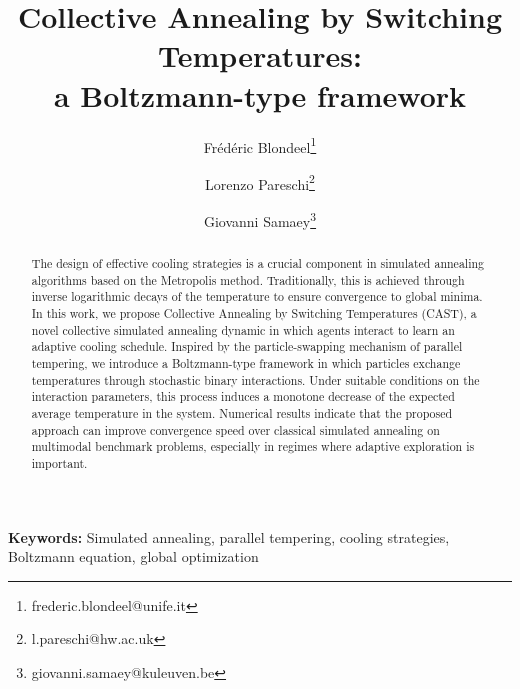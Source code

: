 \documentclass[10pt,a4paper]{article}
\theoremstyle{theorem}
\numberwithin{equation}{section}
\begin{document}
\title{Collective Annealing by Switching Temperatures:\\ a Boltzmann-type framework}
\author[1,2]{Frédéric Blondeel\thanks{frederic.blondeel@unife.it}}
\author[2,3]{Lorenzo Pareschi\thanks{l.pareschi@hw.ac.uk}}
\author[1]{Giovanni Samaey\thanks{giovanni.samaey@kuleuven.be}}

\date{}



\maketitle

\begin{abstract}
The design of effective cooling strategies is a crucial component in simulated annealing algorithms based on the Metropolis method. Traditionally, this is achieved through inverse logarithmic decays of the temperature to ensure convergence to global minima. In this work, we propose Collective Annealing by Switching Temperatures ({CAST}), a novel collective simulated annealing dynamic in which agents interact to learn an adaptive cooling schedule. Inspired by the particle-swapping mechanism of parallel tempering, we introduce a Boltzmann-type framework in which particles exchange temperatures through stochastic binary interactions. Under suitable conditions on the interaction parameters, this process induces a 
monotone decrease of the expected average temperature in the system.
Numerical results indicate that the proposed approach can improve 
convergence speed over classical simulated annealing on multimodal 
benchmark problems, especially in regimes where adaptive exploration is important.
\end{abstract}

\textbf{Keywords:}  Simulated annealing, parallel tempering, cooling strategies, Boltzmann equation, global optimization

\tableofcontents
\end{document}
